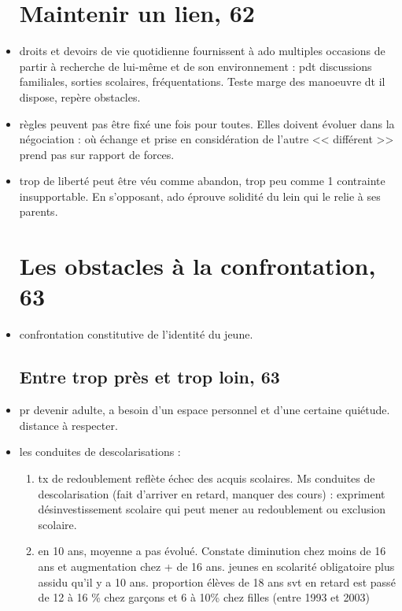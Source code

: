 \documentclass[12pt]{report}
\begin{document}
\begin{itemize}
\section{Maintenir un lien, 62}

\item droits et devoirs de vie quotidienne fournissent à ado multiples occasions de partir à recherche de lui-même et de son environnement : pdt discussions familiales, sorties scolaires, fréquentations. Teste marge des manoeuvre dt il dispose, repère obstacles.\\

\item règles peuvent pas être fixé une fois pour toutes. Elles doivent évoluer dans la négociation : où échange et prise en considération de l'autre << différent >> prend pas sur rapport de forces.\\

\item trop de liberté peut être véu comme abandon, trop peu comme 1 contrainte insupportable. En s'opposant, ado éprouve solidité du lein qui le relie à ses parents.

\section{Les obstacles à la confrontation, 63}

\item confrontation constitutive de l'identité du jeune.

\subsection{Entre trop près et trop loin, 63}

\item pr devenir adulte, a besoin d'un espace personnel et d'une certaine quiétude. distance à respecter.

\item les conduites de descolarisations : 
\begin{enumerate}
\item tx de redoublement reflète échec des acquis scolaires. Ms conduites de descolarisation (fait d'arriver en retard, manquer des cours) : expriment désinvestissement scolaire qui peut mener au redoublement ou exclusion scolaire.\\

\item en 10 ans, moyenne a pas évolué. Constate diminution chez moins de 16 ans et augmentation chez + de 16 ans. jeunes en scolarité obligatoire plus assidu qu'il y a 10 ans. proportion élèves de 18 ans svt en retard est passé de 12 à 16 \% chez garçons et 6 à 10\% chez filles (entre 1993 et 2003)
\end{enumerate}


\end{itemize}
\end{document}
